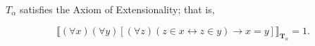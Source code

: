 $T_{\alpha}$ satisfies the Axiom of Extensionality; that is,

$$
\llbracket (\forall x)(\forall y)[(\forall z)(z \in x \leftrightarrow z \in y) \to x = y] \rrbracket_{\mathbf{T}_{\alpha}} = 1.
$$
